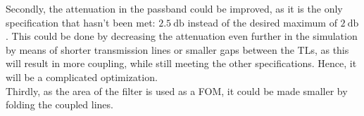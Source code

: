 \documentclass[a4paper]{article}        %
\begin{document}
		Secondly, the attenuation in the passband could be improved, as it is the only specification that hasn't been met: $\SI{2.5}{\decibel}$ instead of the desired maximum of $\SI{2}{\decibel}$. This could be done by decreasing the attenuation even further in the simulation by means of shorter transmission lines or smaller gaps between the TLs, as this will result in more coupling, while still meeting the other specifications. Hence, it will be a complicated optimization. \\

		Thirdly, as the area of the filter is used as a FOM, it could be made smaller by folding the coupled lines. 



\end{document}
